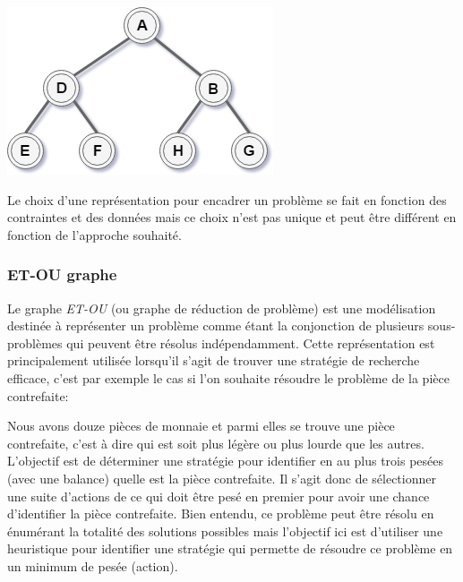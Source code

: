\begin{center}
    \includegraphics[scale=0.6]{../ressources/images/example_tree.png}
\end{center}



Le choix d'une représentation pour encadrer un problème se fait en fonction des contraintes et des données mais ce choix n'est pas unique et peut être différent en fonction de l'approche souhaité.

\subsubsection{ET-OU graphe}
Le graphe \textit{ET-OU} (ou graphe de réduction de problème) est une modélisation destinée à représenter un problème comme étant la conjonction de plusieurs sous-problèmes qui peuvent être résolus indépendamment.
Cette représentation est principalement utilisée lorsqu'il s'agit de trouver une stratégie de recherche efficace, c'est par exemple le cas si l'on souhaite résoudre le problème de la pièce contrefaite:

Nous avons douze pièces de monnaie et parmi elles se trouve une pièce contrefaite, c'est à dire qui est soit plus légère ou plus lourde que les autres. L'objectif est de déterminer une stratégie pour identifier en au plus trois pesées (avec une balance) quelle est la pièce contrefaite. Il s'agit donc de sélectionner une suite d'actions de ce qui doit être pesé en premier pour avoir une chance d'identifier la pièce contrefaite.
Bien entendu, ce problème peut être résolu en énumérant la totalité des solutions possibles mais l'objectif ici est d'utiliser une heuristique pour identifier une stratégie qui permette de résoudre ce problème en un minimum de pesée (action).


